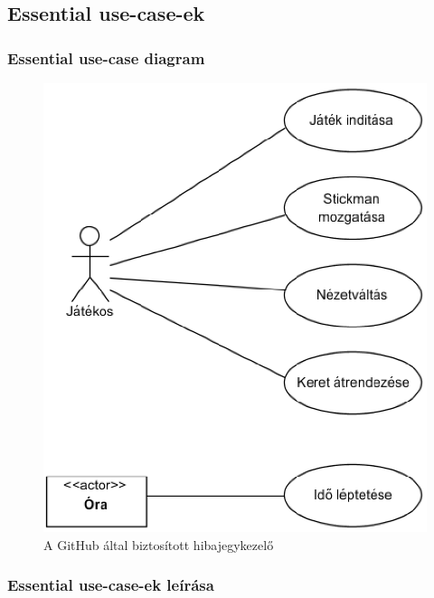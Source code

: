 \subsection{Essential use-case-ek}
	\subsubsection{Essential use-case diagram}
	
		\begin{figure}[h!]
			\begin{center}
				\includegraphics[scale=0.5]{resources/essential_use_cases.png}
				\caption{A GitHub által biztosított hibajegykezelő}
			\end{center}
		\end{figure}
						
	\subsubsection{Essential use-case-ek leírása}
	

